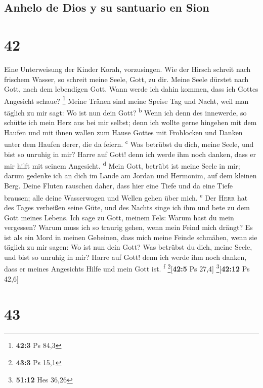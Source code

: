 \hypertarget{anhelo-de-dios-y-su-santuario-en-sion}{%
\subsection{Anhelo de Dios y su santuario en
Sion}\label{anhelo-de-dios-y-su-santuario-en-sion}}

\hypertarget{section-41}{%
\section{42}\label{section-41}}

 Eine Unterweisung der Kinder Korah, vorzusingen.
 Wie der Hirsch schreit nach frischem Wasser, so schreit
meine Seele, Gott, zu dir.  Meine Seele dürstet nach Gott,
nach dem lebendigen Gott. Wann werde ich dahin kommen, dass ich Gottes
Angesicht schaue? \footnote{\textbf{42:3} Ps 84,3}  Meine
Tränen sind meine Speise Tag und Nacht, weil man täglich zu mir sagt: Wo
ist nun dein Gott? \textsuperscript{b}  Wenn ich denn des
innewerde, so schütte ich mein Herz aus bei mir selbst; denn ich wollte
gerne hingehen mit dem Haufen und mit ihnen wallen zum Hause Gottes mit
Frohlocken und Danken unter dem Haufen derer, die da feiern.
\textsuperscript{c}  Was betrübst du dich, meine Seele,
und bist so unruhig in mir? Harre auf Gott! denn ich werde ihm noch
danken, dass er mir hilft mit seinem Angesicht. \textsuperscript{d}
 Mein Gott, betrübt ist meine Seele in mir; darum gedenke
ich an dich im Lande am Jordan und Hermonim, auf dem kleinen Berg.
 Deine Fluten rauschen daher, dass hier eine Tiefe und da
eine Tiefe brausen; alle deine Wasserwogen und Wellen gehen über mich.
\textsuperscript{e}  Der \textsc{Herr} hat des Tages
verheißen seine Güte, und des Nachts singe ich ihm und bete zu dem Gott
meines Lebens.  Ich sage zu Gott, meinem Fels: Warum hast
du mein vergessen? Warum muss ich so traurig gehen, wenn mein Feind mich
drängt?  Es ist als ein Mord in meinen Gebeinen, dass
mich meine Feinde schmähen, wenn sie täglich zu mir sagen: Wo ist nun
dein Gott?  Was betrübst du dich, meine Seele, und bist
so unruhig in mir? Harre auf Gott! denn ich werde ihm noch danken, dass
er meines Angesichts Hilfe und mein Gott ist. \textsuperscript{f}
\footnote{\textbf{43:3} Ps 15,1}{[}\textbf{42:5} Ps 27,4{]}
\footnote{\textbf{51:12} Hes 36,26}{[}\textbf{42:12} Ps 42,6{]}

\hypertarget{section-42}{%
\section{43}\label{section-42}}

